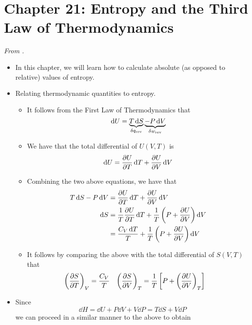 \documentclass[../notes.tex]{subfiles}
\begin{document}
\section{Chapter 21: Entropy and the Third Law of Thermodynamics}
\emph{From \textcite{bib:McQuarrieSimon}.}
\begin{itemize}
    \item {}In this chapter, we will learn how to calculate absolute (as opposed to relative) values of entropy.
    \item Relating thermodynamic quantities to entropy.
    \begin{itemize}
        \item It follows from the First Law of Thermodynamics that
        \begin{equation*}
            \dd{U} = \underbrace{T\dd{S}}_{\var{q_\text{rev}}}\underbrace{-P\dd{V}}_{\var{w_\text{rev}}}
        \end{equation*}
        \item We have that the total differential of $U(V,T)$ is
        \begin{equation*}
            \dd{U} = \pdv{U}{T}\dd{T}+\pdv{U}{V}\dd{V}
        \end{equation*}
        \item Combining the two above equations, we have that
        \begin{align*}
            T\dd{S}-P\dd{V} &= \pdv{U}{T}\dd{T}+\pdv{U}{V}\dd{V}\\
            \dd{S} &= \frac{1}{T}\pdv{U}{T}\dd{T}+\frac{1}{T}\left( P+\pdv{U}{V} \right)\dd{V}\\
            &= \frac{C_V\dd{T}}{T}+\frac{1}{T}\left( P+\pdv{U}{V} \right)\dd{V}
        \end{align*}
        \item It follows by comparing the above with the total differential of $S(V,T)$ that
        \begin{align*}
            \left( \pdv{S}{T} \right)_V &= \frac{C_V}{T}&
            \left( \pdv{S}{V} \right)_T &= \frac{1}{T}\left[ P+\left( \pdv{U}{V} \right)_T \right]
        \end{align*}
    \end{itemize}
    \item Since
    \begin{equation*}
        \dd{H} = \dd{U}+P\dd{V}+V\dd{P}
        = T\dd{S}+V\dd{P}
    \end{equation*}
    we can proceed in a similar manner to the above to obtain

\end{itemize}
\end{document}
